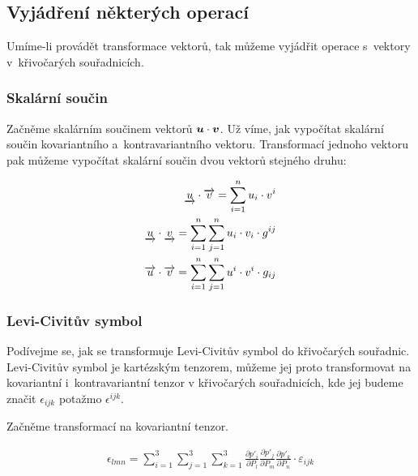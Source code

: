 \subsection{Vyjádření některých operací}

Umíme-li provádět transformace vektorů, tak můžeme vyjádřit operace s~vektory v~křivočarých souřadnicích. 

\subsubsection{Skalární součin}

Začněme skalárním součinem vektorů \(\boldsymbol{u} \cdot \boldsymbol{v}\). Už víme, jak vypočítat skalární součin kovariantního a~kontravariantního vektoru. Transformací jednoho vektoru pak můžeme vypočítat skalární součin dvou vektorů stejného druhu:

\begin{fact}
\begin{equation}
\begin{split}
\underrightarrow{u} \cdot \overrightarrow{v} = \sum_{i=1}^n u_i \cdot v^i \\
\underrightarrow{u} \cdot \underrightarrow{v} = \sum_{i=1}^n \sum_{j=1}^n u_i \cdot v_i \cdot g^{ij} \\
\overrightarrow{u} \cdot \overrightarrow{v} = \sum_{i=1}^n \sum_{j=1}^n u^i \cdot v^i \cdot g_{ij}
\end{split}
\end{equation}
\end{fact}

\subsubsection{Levi-Civitův symbol}

Podívejme se, jak se transformuje Levi-Civitův symbol do křivočarých souřadnic. Levi-Civitův symbol je kartézským tenzorem, můžeme jej proto transformovat na kovariantní i~kontravariantní tenzor v křivočarých souřadnicích, kde jej budeme značit \(\epsilon_{ijk}\) potažmo \(\epsilon^{ijk}\).

Začněme transformací na kovariantní tenzor. 

\begin{equation}
\begin{split}
\epsilon_{lmn} = \sum_{i=1}^3 \sum_{j=1}^3 \sum_{k=1}^3 \frac{\partial p'_i}{\partial P_l} \frac{\partial p'_j}{\partial P_m} \frac{\partial p'_k}{\partial P_n} \cdot \varepsilon_{ijk}
\end{split}
\end{equation}

